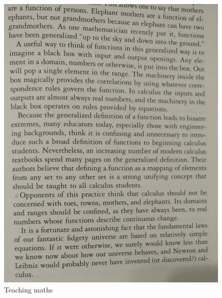 \documentclass{cornell}
\begin{document}
\begin{figure}[!t]
\centering
\includegraphics[width=1.0\linewidth]{images/cme01.jpg}
\caption{Teaching maths }
\label{cme01}
\end{figure}
\end{document}
